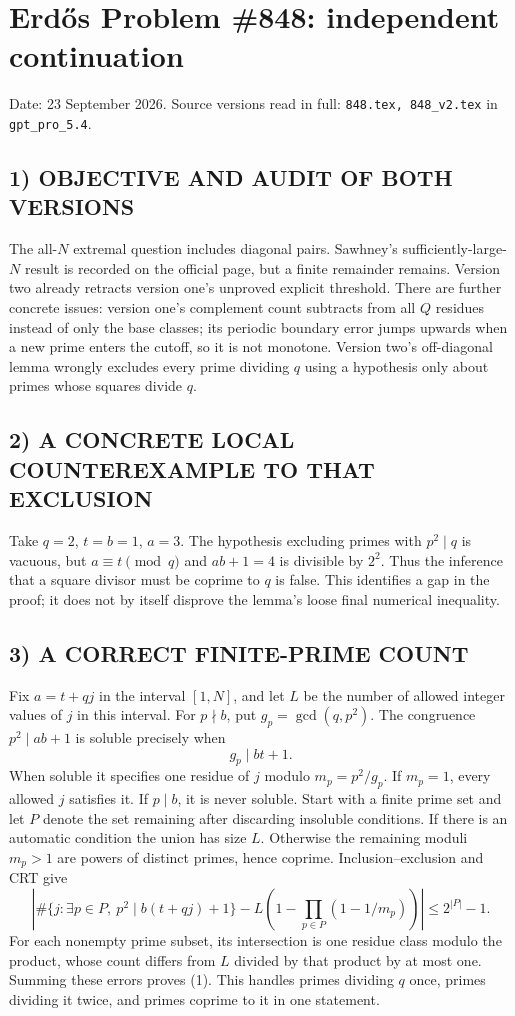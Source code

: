 \section{Erd\H{o}s Problem \#848: independent continuation}
\noindent Date: 23 September 2026. Source versions read in full: \texttt{848.tex, 848\_v2.tex} in \texttt{gpt\_pro\_5.4}.

\subsection*{1) OBJECTIVE AND AUDIT OF BOTH VERSIONS}
The all-$N$ extremal question includes diagonal pairs. Sawhney's sufficiently-large-$N$ result is recorded on the official page, but a finite remainder remains. Version two already retracts version one's unproved explicit threshold. There are further concrete issues: version one's complement count subtracts from all $Q$ residues instead of only the base classes; its periodic boundary error jumps upwards when a new prime enters the cutoff, so it is not monotone. Version two's off-diagonal lemma wrongly excludes every prime dividing $q$ using a hypothesis only about primes whose squares divide $q$.
\subsection*{2) A CONCRETE LOCAL COUNTEREXAMPLE TO THAT EXCLUSION}
Take $q=2$, $t=b=1$, $a=3$. The hypothesis excluding primes with $p^2\mid q$ is vacuous, but $a\equiv t\pmod q$ and $ab+1=4$ is divisible by $2^2$. Thus the inference that a square divisor must be coprime to $q$ is false. This identifies a gap in the proof; it does not by itself disprove the lemma's loose final numerical inequality.
\subsection*{3) A CORRECT FINITE-PRIME COUNT}
Fix $a=t+qj$ in the interval $[1,N]$, and let $L$ be the number of allowed integer values of $j$ in this interval. For $p\nmid b$, put $g_p=\gcd(q,p^2)$. The congruence $p^2\mid ab+1$ is soluble precisely when
\[
g_p\mid bt+1.
\]
When soluble it specifies one residue of $j$ modulo $m_p=p^2/g_p$. If $m_p=1$, every allowed $j$ satisfies it. If $p\mid b$, it is never soluble.
Start with a finite prime set and let $P$ denote the set remaining after discarding insoluble conditions. If there is an automatic condition the union has size $L$. Otherwise the remaining moduli $m_p>1$ are powers of distinct primes, hence coprime. Inclusion--exclusion and CRT give
\[
\left|\#\{j:\exists p\in P,\ p^2\mid b(t+qj)+1\}
-L\left(1-\prod_{p\in P}(1-1/m_p)\right)\right|
\le2^{|P|}-1. \tag{1}
\]
For each nonempty prime subset, its intersection is one residue class modulo the product, whose count differs from $L$ divided by that product by at most one. Summing these errors proves (1). This handles primes dividing $q$ once, primes dividing it twice, and primes coprime to it in one statement.
